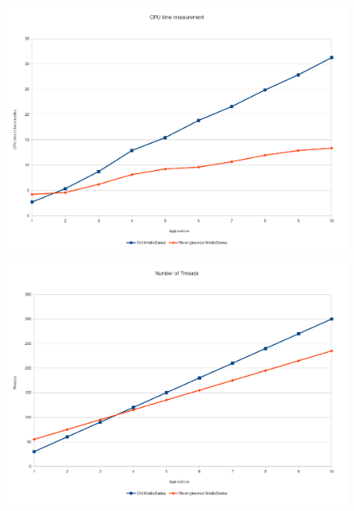 \begin{figure}[H]
		\centering
    	\includegraphics[scale=0.50]{part_7/test_results/cputime.pdf}
\end{figure}

\begin{figure}[H]
		\centering
    	\includegraphics[scale=0.50]{part_7/test_results/threads.pdf}
\end{figure}

